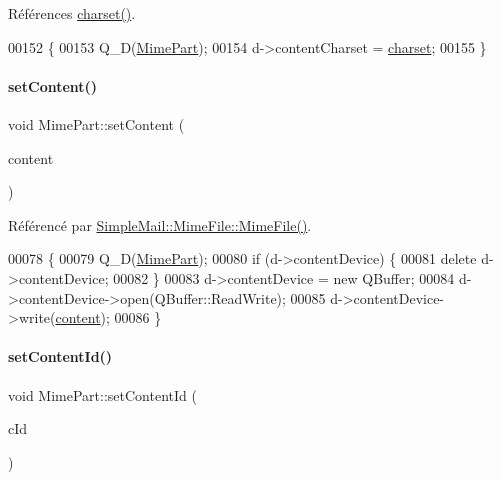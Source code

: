 Références \hyperlink{class_simple_mail_1_1_mime_part_a419b2efe442eb59002ae14c8ab18f94e}{charset()}.


\begin{DoxyCode}
00152 \{
00153     Q\_D(\hyperlink{class_simple_mail_1_1_mime_part}{MimePart});
00154     d->contentCharset = \hyperlink{class_simple_mail_1_1_mime_part_a419b2efe442eb59002ae14c8ab18f94e}{charset};
00155 \}
\end{DoxyCode}
\mbox{\label{class_simple_mail_1_1_mime_part_a16791412c7235c04bf16a57120a45b84}} 
\paragraph{\texorpdfstring{set\+Content()}{setContent()}}
{\footnotesize\ttfamily void Mime\+Part\+::set\+Content (\begin{DoxyParamCaption}\item[{const Q\+Byte\+Array \&}]{content }\end{DoxyParamCaption})}



Référencé par \hyperlink{class_simple_mail_1_1_mime_file_a813f54f8423832b33fac1a85820bdb4a}{Simple\+Mail\+::\+Mime\+File\+::\+Mime\+File()}.


\begin{DoxyCode}
00078 \{
00079     Q\_D(\hyperlink{class_simple_mail_1_1_mime_part}{MimePart});
00080     \textcolor{keywordflow}{if} (d->contentDevice) \{
00081         \textcolor{keyword}{delete} d->contentDevice;
00082     \}
00083     d->contentDevice = \textcolor{keyword}{new} QBuffer;
00084     d->contentDevice->open(QBuffer::ReadWrite);
00085     d->contentDevice->write(\hyperlink{class_simple_mail_1_1_mime_part_a22fd1bc02bce6c9655d879fd71620bf5}{content});
00086 \}
\end{DoxyCode}
\mbox{\label{class_simple_mail_1_1_mime_part_a710551ded129f4a9c7ea0f74d8d90bb9}} 
\paragraph{\texorpdfstring{set\+Content\+Id()}{setContentId()}}
{\footnotesize\ttfamily void Mime\+Part\+::set\+Content\+Id (\begin{DoxyParamCaption}\item[{const Q\+Byte\+Array \&}]{c\+Id }\end{DoxyParamCaption})}


